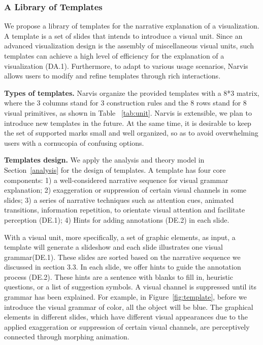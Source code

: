 \subsubsection{A Library of Templates}
We propose a library of templates for the narrative explanation of a visualization. A template is a set of slides that intends to introduce a visual unit. Since an advanced visualization design is the assembly of miscellaneous visual units, such templates can achieve a high level of efficiency for the explanation of a visualization (DA.1). Furthermore, to adapt to various usage scenarios, Narvis allows users to modify and refine templates through rich interactions.

\noindent
\textbf{Types of templates.}
Narvis organize the provided templates with a 8*3 matrix, where the 3 columns stand for 3 construction rules and the 8 rows stand for  8 visual primitives, as shown in Table ~\ref{tab:unit}. Narvis is extensible, we plan to introduce new templates in the future. At the same time, it is desirable to keep the set of supported marks small and well organized, so as to avoid overwhelming users with a cornucopia of confusing options.

\noindent
\textbf{Templates design.}
We apply the analysis and theory model in Section~\ref{analysis} for the design of templates. A template has four core components: 1) a well-considered narrative sequence for visual grammar explanation; 2) exaggeration or suppression of certain visual channels in some slides; 3) a series of narrative techniques such as attention cues, animated transitions, information repetition, to orientate visual attention and facilitate perception (DE.1); 4) Hints for adding annotations (DE.2) in each slide. 

With a visual unit, more specifically, a set of graphic elements, as input, a template will generate a slideshow and each slide illustrates one visual grammar(DE.1). These slides are sorted based on the narrative sequence we discussed in section 3.3. In each slide, we offer hints to guide the annotation process (DE.2). These hints are a sentence with blanks to fill in, heuristic questions, or a list of suggestion symbols. A visual channel is suppressed until its grammar has been explained. For example, in Figure~\ref{fig:template}, before we introduce the visual grammar of color, all the object will be blue. The graphical elements in different slides, which have different visual appearances due to the applied exaggeration or suppression of certain visual channels, are perceptively connected through morphing animation. 

